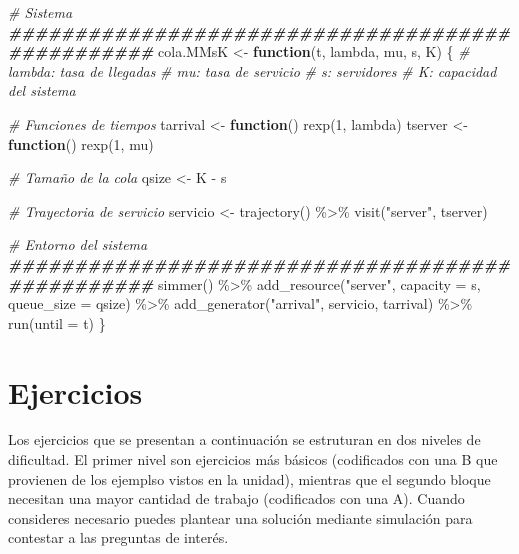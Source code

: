 \documentclass[
]{book}
\newenvironment{Shaded}{\begin{snugshade}}{\end{snugshade}}
\newcommand{\AttributeTok}[1]{\textcolor[rgb]{0.77,0.63,0.00}{#1}}
\newcommand{\CommentTok}[1]{\textcolor[rgb]{0.56,0.35,0.01}{\textit{#1}}}
\newcommand{\ControlFlowTok}[1]{\textcolor[rgb]{0.13,0.29,0.53}{\textbf{#1}}}
\newcommand{\DecValTok}[1]{\textcolor[rgb]{0.00,0.00,0.81}{#1}}
\newcommand{\DocumentationTok}[1]{\textcolor[rgb]{0.56,0.35,0.01}{\textbf{\textit{#1}}}}
\newcommand{\FunctionTok}[1]{\textcolor[rgb]{0.00,0.00,0.00}{#1}}
\newcommand{\NormalTok}[1]{#1}
\newcommand{\OtherTok}[1]{\textcolor[rgb]{0.56,0.35,0.01}{#1}}
\newcommand{\SpecialCharTok}[1]{\textcolor[rgb]{0.00,0.00,0.00}{#1}}
\newcommand{\StringTok}[1]{\textcolor[rgb]{0.31,0.60,0.02}{#1}}
\theoremstyle{definition}
\theoremstyle{definition}
\theoremstyle{definition}
\theoremstyle{definition}
\theoremstyle{remark}
\begin{document}
\begin{Shaded}
\begin{Highlighting}[]
\CommentTok{\# Sistema}
\DocumentationTok{\#\#\#\#\#\#\#\#\#\#\#\#\#\#\#\#\#\#\#\#\#\#\#\#\#\#\#\#\#\#\#\#\#\#\#\#\#\#\#\#\#\#\#\#\#\#\#\#\#}
\NormalTok{cola.MMsK }\OtherTok{\textless{}{-}} \ControlFlowTok{function}\NormalTok{(t, lambda, mu, s, K)}
\NormalTok{\{}
  \CommentTok{\# lambda: tasa de llegadas}
  \CommentTok{\# mu: tasa de servicio}
  \CommentTok{\# s: servidores}
  \CommentTok{\# K: capacidad del sistema}

  \CommentTok{\# Funciones de tiempos}
\NormalTok{  tarrival }\OtherTok{\textless{}{-}} \ControlFlowTok{function}\NormalTok{() }\FunctionTok{rexp}\NormalTok{(}\DecValTok{1}\NormalTok{, lambda)}
\NormalTok{  tserver }\OtherTok{\textless{}{-}} \ControlFlowTok{function}\NormalTok{() }\FunctionTok{rexp}\NormalTok{(}\DecValTok{1}\NormalTok{, mu)}
  
  \CommentTok{\# Tamaño de la cola}
\NormalTok{  qsize }\OtherTok{\textless{}{-}}\NormalTok{ K }\SpecialCharTok{{-}}\NormalTok{ s}
  
  \CommentTok{\# Trayectoria de servicio}
\NormalTok{  servicio }\OtherTok{\textless{}{-}} \FunctionTok{trajectory}\NormalTok{() }\SpecialCharTok{\%\textgreater{}\%}
    \FunctionTok{visit}\NormalTok{(}\StringTok{"server"}\NormalTok{, tserver)               }

  \CommentTok{\# Entorno del sistema }
  \DocumentationTok{\#\#\#\#\#\#\#\#\#\#\#\#\#\#\#\#\#\#\#\#\#\#\#\#\#\#\#\#\#\#\#\#\#\#\#\#\#\#\#\#\#\#\#\#\#\#\#\#\#}
  \FunctionTok{simmer}\NormalTok{() }\SpecialCharTok{\%\textgreater{}\%}
    \FunctionTok{add\_resource}\NormalTok{(}\StringTok{"server"}\NormalTok{, }\AttributeTok{capacity =}\NormalTok{ s, }\AttributeTok{queue\_size =}\NormalTok{ qsize) }\SpecialCharTok{\%\textgreater{}\%}           
    \FunctionTok{add\_generator}\NormalTok{(}\StringTok{"arrival"}\NormalTok{, servicio, tarrival) }\SpecialCharTok{\%\textgreater{}\%} 
    \FunctionTok{run}\NormalTok{(}\AttributeTok{until =}\NormalTok{ t)     }
\NormalTok{\}}
\end{Highlighting}
\end{Shaded}

\hypertarget{COLASG}{%
\section{Ejercicios}\label{COLASG}}

Los ejercicios que se presentan a continuación se estruturan en dos niveles de dificultad. El primer nivel son ejercicios más básicos (codificados con una B que provienen de los ejemplso vistos en la unidad), mientras que el segundo bloque necesitan una mayor cantidad de trabajo (codificados con una A). Cuando consideres necesario puedes plantear una solución mediante simulación para contestar a las preguntas de interés.
\end{document}
